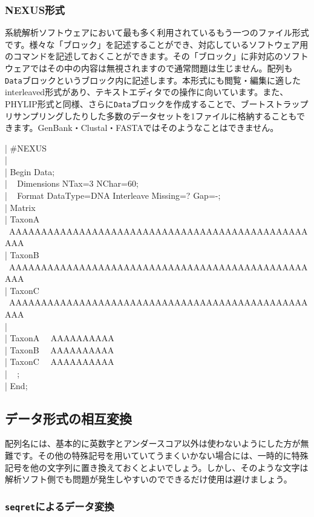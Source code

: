 \documentclass[titlepage,10pt,a4paper]{jsbook}
\newenvironment{content}{\begin{shaded}\vspace{-1em}\raggedright\ttfamily\footnotesize\setlength{\baselineskip}{1.4em}}{\end{shaded}\vspace{-1em}}
\begin{document}
\subsubsection{NEXUS形式}

系統解析ソフトウェアにおいて最も多く利用されているもう一つのファイル形式です。様々な「ブロック」を記述することができ、対応しているソフトウェア用のコマンドを記述しておくことができます。その「ブロック」に非対応のソフトウェアではその中の内容は無視されますので通常問題は生じません。配列も\texttt{Data}ブロックというブロック内に記述します。本形式にも閲覧・編集に適したinterleaved形式があり、テキストエディタでの操作に向いています。また、PHYLIP形式と同様、さらに\texttt{Data}ブロックを作成することで、ブートストラップリサンプリングしたりした多数のデータセットを1ファイルに格納することもできます。GenBank・Clustal・FASTAではそのようなことはできません。
\begin{content}
| \#NEXUS\\
| ~\\
| Begin Data;\\
| ~ Dimensions NTax=3 NChar=60;\\
| ~ Format DataType=DNA Interleave Missing=? Gap=-;\\
| Matrix\\
| TaxonA~ ~AAAAAAAAAAAAAAAAAAAAAAAAAAAAAAAAAAAAAAAAAAAAAAAAAA\\
| TaxonB~ ~AAAAAAAAAAAAAAAAAAAAAAAAAAAAAAAAAAAAAAAAAAAAAAAAAA\\
| TaxonC~ ~AAAAAAAAAAAAAAAAAAAAAAAAAAAAAAAAAAAAAAAAAAAAAAAAAA\\
| ~\\
| TaxonA~ ~AAAAAAAAAA\\
| TaxonB~ ~AAAAAAAAAA\\
| TaxonC~ ~AAAAAAAAAA\\
| ~ ;\\
| End;
\end{content}

\subsection{データ形式の相互変換}

配列名には、基本的に英数字とアンダースコア以外は使わないようにした方が無難です。その他の特殊記号を用いていてうまくいかない場合には、一時的に特殊記号を他の文字列に置き換えておくとよいでしょう。しかし、そのような文字は解析ソフト側でも問題が発生しやすいのでできるだけ使用は避けましょう。

\subsubsection{\texttt{seqret}によるデータ変換}
\end{document}
